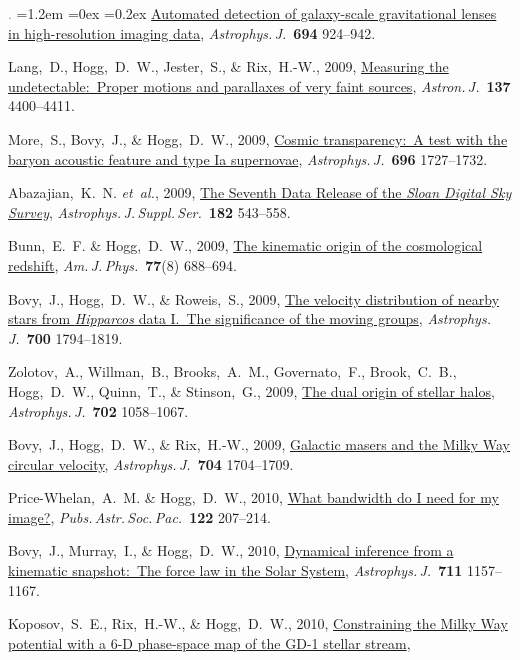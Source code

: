 \documentclass[10pt,letterpaper]{article}
\newcommand{\foreign}[1]{\textsl{#1}}
\newcommand{\etal}{\foreign{et~al.}}
\newcommand{\project}[1]{\textsl{#1}}
\newcommand{\doi}[2]{\href{http://dx.doi.org/#1}{{#2}}}
\newcommand{\deemph}[1]{\textcolor{grey}{\footnotesize{#1}}}
\newcommand{\pubnumber}[1]{\deemph{{#1}.}}
\newcounter{refpubnum}
\newcommand{\hogglist}{%
    \rightmargin=0in
    \leftmargin=1.2em
    \topsep=0ex
    \partopsep=0pt
    \itemsep=0.2ex
    \parsep=0pt
    \itemindent=-1.0\leftmargin
    \listparindent=0.0\leftmargin
    \settowidth{\labelsep}{~}
    \usecounter{refpubnum}
  }
\begin{document}
\begin{list}{\pubnumber{\therefpubnum}}{\hogglist}
\doi{10.1088/0004-637X/694/2/924}{Automated detection of galaxy-scale gravitational lenses in high-resolution imaging data},
\textit{Astrophys.\,J.}\ \textbf{694} 924--942.
\item
Lang,~D., Hogg,~D.~W., Jester,~S., \& Rix,~H.-W., 2009,
\doi{10.1088/0004-6256/137/5/4400}{Measuring the undetectable:\ Proper motions and parallaxes of very faint sources},
\textit{Astron.\,J.}\ \textbf{137} 4400--4411.
\item
More,~S., Bovy,~J., \& Hogg,~D.~W., 2009,
\doi{10.1088/0004-637X/696/2/1727}{Cosmic transparency:\ A test with the baryon acoustic feature and type Ia supernovae},
\textit{Astrophys.\,J.}\ \textbf{696} 1727--1732.
\item
Abazajian,~K.~N. \etal, 2009,
\doi{10.1088/0067-0049/182/2/543}{The Seventh Data Release of the \project{Sloan Digital Sky Survey}},
\textit{Astrophys.\,J.\,Suppl.\,Ser.}\ \textbf{182} 543--558.
\item
Bunn,~E.~F. \& Hogg,~D.~W., 2009,
\doi{10.1119/1.3129103}{The kinematic origin of the cosmological redshift},
\textit{Am.\,J.\,Phys.}\ \textbf{77}(8) 688--694.
\item
Bovy,~J., Hogg,~D.~W., \& Roweis,~S., 2009,
\doi{10.1088/0004-637X/700/2/1794}{The velocity distribution of nearby stars from \project{Hipparcos} data I.~The significance of the moving groups},
\textit{Astrophys.\,J.}\ \textbf{700} 1794--1819.
\item
Zolotov,~A., Willman,~B., Brooks,~A.~M., Governato,~F., Brook,~C.~B., Hogg,~D.~W., Quinn,~T., \& Stinson,~G., 2009,
\doi{10.1088/0004-637X/702/2/1058}{The dual origin of stellar halos},
\textit{Astrophys.\,J.}\ \textbf{702} 1058--1067.
\item
Bovy,~J., Hogg,~D.~W., \& Rix,~H.-W., 2009,
\doi{10.1088/0004-637X/704/2/1704}{Galactic masers and the Milky Way circular velocity},
\textit{Astrophys.\,J.}\ \textbf{704} 1704--1709.
\item
Price-Whelan,~A.~M. \& Hogg,~D.~W., 2010,
\doi{10.1086/651009}{What bandwidth do I need for my image?},
\textit{Pubs.\,Astr.\,Soc.\,Pac.}\ \textbf{122} 207--214.
\item
Bovy,~J., Murray,~I., \& Hogg,~D.~W., 2010,
\doi{10.1088/0004-637X/711/2/1157}{Dynamical inference from a kinematic snapshot:\ The force law in the Solar System},
\textit{Astrophys.\,J.}\ \textbf{711} 1157--1167.
\item
Koposov,~S.~E., Rix,~H.-W., \& Hogg,~D.~W., 2010,
\doi{10.1088/0004-637X/712/1/260}{Constraining the Milky Way potential with a 6-D phase-space map of the GD-1 stellar stream},

\end{list}
\end{document}

